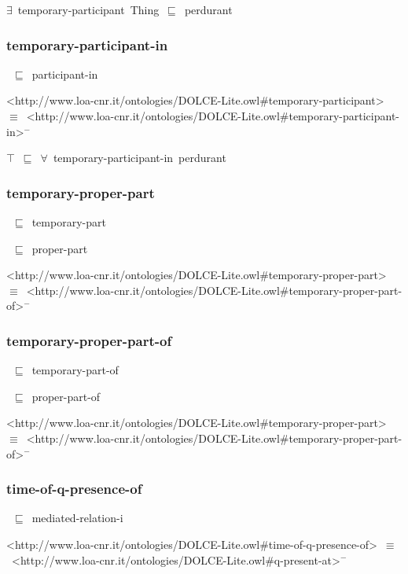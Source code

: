 \documentclass{article}
\begin{document}
\ensuremath{\exists}~temporary-participant~Thing~\ensuremath{\sqsubseteq}~perdurant

\subsubsection*{temporary-participant-in}

~\ensuremath{\sqsubseteq}~participant-in

<http://www.loa-cnr.it/ontologies/DOLCE-Lite.owl#temporary-participant>~\ensuremath{\equiv}~<http://www.loa-cnr.it/ontologies/DOLCE-Lite.owl#temporary-participant-in>\ensuremath{^-}

\ensuremath{\top}~\ensuremath{\sqsubseteq}~\ensuremath{\forall}~temporary-participant-in~perdurant

\subsubsection*{temporary-proper-part}

~\ensuremath{\sqsubseteq}~temporary-part

~\ensuremath{\sqsubseteq}~proper-part

<http://www.loa-cnr.it/ontologies/DOLCE-Lite.owl#temporary-proper-part>~\ensuremath{\equiv}~<http://www.loa-cnr.it/ontologies/DOLCE-Lite.owl#temporary-proper-part-of>\ensuremath{^-}

\subsubsection*{temporary-proper-part-of}

~\ensuremath{\sqsubseteq}~temporary-part-of

~\ensuremath{\sqsubseteq}~proper-part-of

<http://www.loa-cnr.it/ontologies/DOLCE-Lite.owl#temporary-proper-part>~\ensuremath{\equiv}~<http://www.loa-cnr.it/ontologies/DOLCE-Lite.owl#temporary-proper-part-of>\ensuremath{^-}

\subsubsection*{time-of-q-presence-of}

~\ensuremath{\sqsubseteq}~mediated-relation-i

<http://www.loa-cnr.it/ontologies/DOLCE-Lite.owl#time-of-q-presence-of>~\ensuremath{\equiv}~<http://www.loa-cnr.it/ontologies/DOLCE-Lite.owl#q-present-at>\ensuremath{^-}
\end{document}
